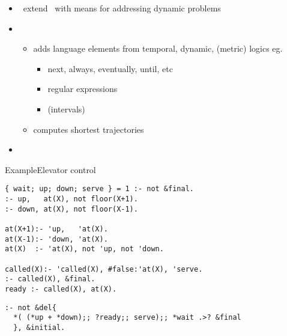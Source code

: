 \begin{frame}{\telingo}
  \begin{itemize}
  \item {} \ extend \clingo\ with means for addressing dynamic problems
  \item {} \
    \begin{itemize}
    \item adds language elements from temporal, dynamic, (metric) logics
      eg.\
      \begin{itemize}\small
      \item next, always, eventually, until, etc
      \item regular expressions
      \item (intervals)
      \end{itemize}
    \item computes shortest trajectories
    \end{itemize}
  \item {} \ \cite{cakamosc19a,cadilasc20a}
  \end{itemize}
\end{frame}
\begin{frame}[fragile,shrink]{Example}{Elevator control}
\begin{lstlisting}[language=clingo,basicstyle=\small\ttfamily]
{ wait; up; down; serve } = 1 :- not &final.
:- up,   at(X), not floor(X+1).
:- down, at(X), not floor(X-1).

at(X+1):- 'up,   'at(X).
at(X-1):- 'down, 'at(X).
at(X)  :- 'at(X), not 'up, not 'down.

called(X):- 'called(X), #false:'at(X), 'serve.
:- called(X), &final.
ready :- called(X), at(X).
\end{lstlisting}
\pause
\begin{lstlisting}[language=clingo,basicstyle=\small\ttfamily]
:- not &del{
  *( (*up + *down);; ?ready;; serve);; *wait .>? &final
  }, &initial.
\end{lstlisting}
\end{frame}
%
